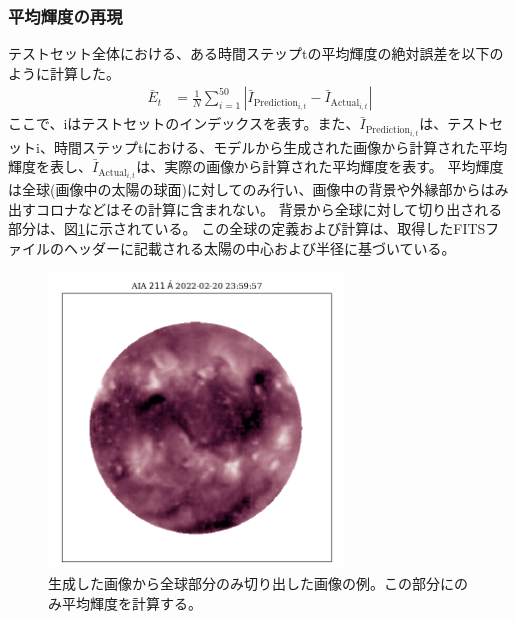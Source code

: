       \subsubsection{平均輝度の再現}
        テストセット全体における、ある時間ステップtの平均輝度の絶対誤差を以下のように計算した。
        \begin{align}
          \bar{E}_{t} & = \frac{1}{N} \sum_{i=1}^{50} | \bar{I}_{\text{Prediction}_{i,t}} - \bar{I}_{\text{Actual}_{i,t}} |
        \end{align}
        ここで、iはテストセットのインデックスを表す。また、\( \bar{I}_{\text{Prediction}_{i,t}} \)は、テストセットi、時間ステップtにおける、モデルから生成された画像から計算された平均輝度を表し、\( \bar{I}_{\text{Actual}_{i,t}} \)は、実際の画像から計算された平均輝度を表す。
        平均輝度は全球(画像中の太陽の球面)に対してのみ行い、画像中の背景や外縁部からはみ出すコロナなどはその計算に含まれない。
        背景から全球に対して切り出される部分は、図\ref{fig:exp1_fulldisk_crop}に示されている。
        この全球の定義および計算は、取得したFITSファイルのヘッダーに記載される太陽の中心および半径に基づいている。
        \begin{figure}[htpb]
          \centering
          \includegraphics[width=0.7\textwidth]{figures/exp1/crop_map.png}
          \caption{生成した画像から全球部分のみ切り出した画像の例。この部分にのみ平均輝度を計算する。}
          \label{fig:exp1_fulldisk_crop}
        \end{figure}

